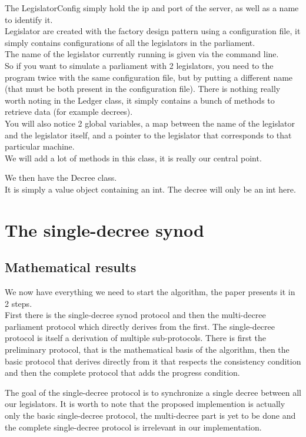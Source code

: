 \documentclass{article}
\begin{document}
The LegislatorConfig simply hold the ip and port of the server, as well as a name to identify it.\\
Legislator are created with the factory design pattern using a configuration file, it simply contains configurations of all the legislators in the parliament.\\
The name of the legislator currently running is given via the command line.\\
So if you want to simulate a parliament with 2 legislators, you need to the program twice with the same configuration file, but by putting a different name (that must be both present in the configuration file).
There is nothing really worth noting in the Ledger class, it simply contains a bunch of methods to retrieve data (for example decrees).\\
You will also notice 2 global variables, a map between the name of the legislator and the legislator itself, and a pointer to the legislator that corresponds to that particular machine.\\

We will add a lot of methods in this class, it is really our central point.

We then have the Decree class.\\
It is simply a value object containing an int. The decree will only be an int here.

\pagebreak
\section{The single-decree synod}
\subsection{Mathematical results}
We now have everything we need to start the algorithm, the paper presents it in 2 steps.\\
First there is the single-decree synod protocol and then the multi-decree parliament protocol which directly derives from the first.
The single-decree protocol is itself a derivation of multiple sub-protocols. There is first the preliminary protocol, that is the mathematical basis of the algorithm, then the basic protocol that derives directly from it that respects the consistency condition and then the complete protocol that adds the progress condition.

The goal of the single-decree protocol is to synchronize a single decree between all our legislators. It is worth to note that the proposed implemention is actually only the basic single-decree protocol, the multi-decree part is yet to be done and the complete single-decree protocol is irrelevant in our implementation.
\end{document}
